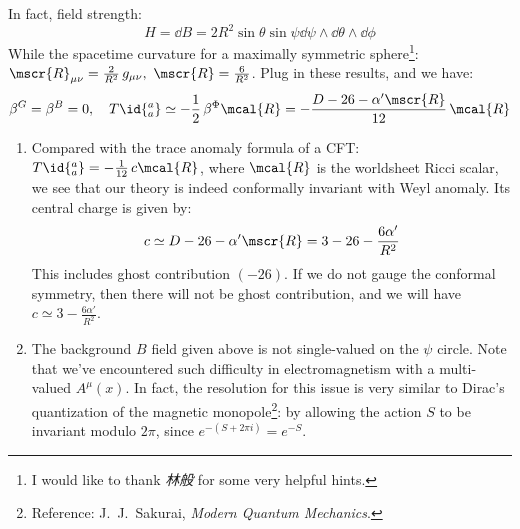\documentclass[a4paper,10pt]{article}
\begin{document}
\begin{enumerate}
	In fact, field strength:
	\begin{equation}
		H = \dd{B}
		= 2R^2 \sin\theta \sin\psi 
			\dd{\psi}
			\wedge\dd{\theta}
			\wedge\dd{\phi}
	\end{equation}
	While the spacetime curvature for a maximally symmetric sphere\footnote{
		I would like to thank \textit{林般} for some very helpful hints. 
	}: $
		\mscr{R}_{\mu\nu}
		= \frac{2}{R^2}\,g_{\mu\nu},\ %
		\mscr{R} = \frac{6}{R^2}
	$. Plug in these results, and we have:
	\begin{equation}
		\beta^G = \beta^B = 0,\quad
		T\id{^a_a}
		\simeq -\frac{1}{2}\,\beta^{\Phi} \mcal{R}
		= -\frac{D-26 - \alpha'\mscr{R}}{12}\,
			\mcal{R}
	\end{equation}
	
	\begin{enumerate}
	\item Compared with the trace anomaly formula of a CFT: $
		T\id{^a_a} = -\frac{1}{12}\,c\mcal{R}
	$, where $\mcal{R}$ is the worldsheet Ricci scalar, we see that our theory is indeed conformally invariant with Weyl anomaly. Its central charge is given by:
	\begin{equation}
		c \simeq D-26 - \alpha'\mscr{R}
		= 3 - 26 - \frac{6\alpha'}{R^2}
	\end{equation}
	This includes ghost contribution $(-26)$. If we do not gauge the conformal symmetry, then there will not be ghost contribution, and we will have $
		c \simeq 3 - \frac{6\alpha'}{R^2}
	$. 
	
	\item The background $B$ field given above is not single-valued on the $\psi$ circle. Note that we've encountered such difficulty in electromagnetism with a multi-valued $A^\mu(x)$. In fact, the resolution for this issue is very similar to Dirac's quantization of the magnetic monopole\footnote{
		Reference: J.~J.~Sakurai, \textit{Modern Quantum Mechanics}. 
	}: by allowing the action $S$ to be invariant modulo $2\pi$, since $
		e^{-(S + 2\pi i)} = e^{-S}
	$. 
	

\end{enumerate}
\end{enumerate}
\end{document}

